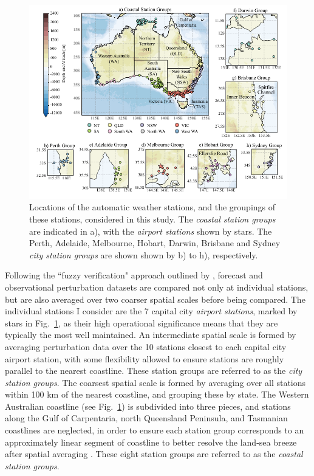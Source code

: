 \documentclass{ametsoc}
\begin{document}
\begin{figure}
\centering
\includegraphics[width=39pc]{map.pdf}
\caption{Locations of the automatic weather stations, and the groupings of these stations, considered in this study. The \textit{coastal station groups} are indicated in a), with the \textit{airport stations} shown by stars. The Perth, Adelaide, Melbourne, Hobart, Darwin, Brisbane and Sydney \textit{city station groups} are shown shown by b) to h), respectively.}
\label{Fig:map}
\end{figure}

Following the ``fuzzy verification" approach outlined by \citet{ebert08}, forecast and observational perturbation datasets are compared not only at individual stations, but are also averaged over two coarser spatial scales before being compared. The individual stations I consider are the 7 capital city \textit{airport stations}, marked by stars in Fig.~\ref{Fig:map}, as their high operational significance means that they are typically the most well maintained. An intermediate spatial scale is formed by averaging perturbation data over the 10 stations closest to each capital city airport station, with some flexibility allowed to ensure stations are roughly parallel to the nearest coastline. These station groups are referred to as the \textit{city station groups}. The coarsest spatial scale is formed by averaging over all stations within 100 km of the nearest coastline, and grouping these by state. The Western Australian coastline (see Fig.~\ref{Fig:map}) is subdivided into three pieces, and stations along the Gulf of Carpentaria, north Queensland Peninsula, and Tasmanian coastlines are neglected, in order to ensure each station group corresponds to an approximately linear segment of coastline to better resolve the land-sea breeze after spatial averaging \citep[e.g.][]{vincent16}. These eight station groups are referred to as the \textit{coastal station groups}.
\end{document}
